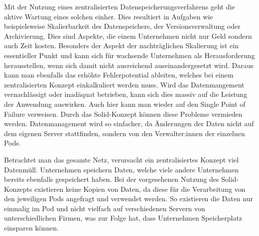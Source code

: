 \documentclass[acmtog]{acmart}
\begin{document}
Mit der Nutzung eines zentralisierten Datenspeicherungsverfahrens geht die aktive Wartung eines solchen einher. Dies resultiert in Aufgaben wie beispielsweise Skalierbarkeit des Datenspeichers, der Versionsverwaltung oder Archivierung. Dies sind Aspekte, die einem Unternehmen nicht nur Geld sondern auch Zeit kosten. Besonders der Aspekt der nachträglichen Skalierung ist ein essentieller Punkt und kann sich für wachsende Unternehmen als Herausforderung herausstellen, wenn sich damit nicht ausreichend auseinandergesetzt wird.
Daraus kann man ebenfalls das erhöhte Fehlerpotential ableiten, welches bei einem zentralisierten Konzept einkalkuliert werden muss. Wird das Datenmangement vernachlässigt oder inadäquat betrieben, kann sich dies massiv auf die Leistung der Anwendung auswirken. Auch hier kann man wieder auf den Single Point of Failure verweisen. Durch das Solid-Konzept können diese Probleme vermieden werden. Datenmanagement wird so einfacher, da Änderungen der Daten nicht auf dem eigenen Server stattfinden, sondern von den Verwalter:innen der einzelnen Pods. 

Betrachtet man das gesamte Netz, verursacht ein zentralisiertes Konzept viel Datenmüll. Unternehmen speichern Daten, welche viele andere Unternehmen bereits ebenfalls gespeichert haben. Bei der vorgesehenen Nutzung des Solid-Konzepts existieren keine Kopien von Daten, da diese für die Verarbeitung von den jeweiligen Pods angefragt und verwendet werden. So existieren die Daten nur einmalig im Pod und nicht vielfach auf verschiedenen Servern von unterschiedlichen Firmen, was zur Folge hat, dass Unternehmen Speicherplatz einsparen können.


\end{document}

